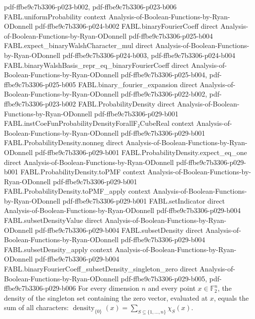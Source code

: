 \begin{theorem}
  {pdf-ffbe9c7b3306-p023-b002,
    pdf-ffbe9c7b3306-p023-b006}
\proofstep
  {FABL.uniformProbability}
  {context}
  {Analysis-of-Boolean-Functions-by-Ryan-ODonnell}
  {pdf-ffbe9c7b3306-p024-b002}
\proofstep
  {FABL.binaryFourierCoeff}
  {direct}
  {Analysis-of-Boolean-Functions-by-Ryan-ODonnell}
  {pdf-ffbe9c7b3306-p025-b004}
\proofstep
  {FABL.expect_binaryWalshCharacter_mul}
  {direct}
  {Analysis-of-Boolean-Functions-by-Ryan-ODonnell}
  {pdf-ffbe9c7b3306-p024-b003,
    pdf-ffbe9c7b3306-p024-b004}
\proofstep
  {FABL.binaryWalshBasis_repr_eq_binaryFourierCoeff}
  {direct}
  {Analysis-of-Boolean-Functions-by-Ryan-ODonnell}
  {pdf-ffbe9c7b3306-p025-b004,
    pdf-ffbe9c7b3306-p025-b005}
\proofstep
  {FABL.binary_fourier_expansion}
  {direct}
  {Analysis-of-Boolean-Functions-by-Ryan-ODonnell}
  {pdf-ffbe9c7b3306-p022-b002,
    pdf-ffbe9c7b3306-p023-b002}
\proofstep
  {FABL.ProbabilityDensity}
  {direct}
  {Analysis-of-Boolean-Functions-by-Ryan-ODonnell}
  {pdf-ffbe9c7b3306-p029-b001}
\proofstep
  {FABL.instCoeFunProbabilityDensityForallF₂CubeReal}
  {context}
  {Analysis-of-Boolean-Functions-by-Ryan-ODonnell}
  {pdf-ffbe9c7b3306-p029-b001}
\proofstep
  {FABL.ProbabilityDensity.nonneg}
  {direct}
  {Analysis-of-Boolean-Functions-by-Ryan-ODonnell}
  {pdf-ffbe9c7b3306-p029-b001}
\proofstep
  {FABL.ProbabilityDensity.expect_eq_one}
  {direct}
  {Analysis-of-Boolean-Functions-by-Ryan-ODonnell}
  {pdf-ffbe9c7b3306-p029-b001}
\proofstep
  {FABL.ProbabilityDensity.toPMF}
  {context}
  {Analysis-of-Boolean-Functions-by-Ryan-ODonnell}
  {pdf-ffbe9c7b3306-p029-b001}
\proofstep
  {FABL.ProbabilityDensity.toPMF_apply}
  {context}
  {Analysis-of-Boolean-Functions-by-Ryan-ODonnell}
  {pdf-ffbe9c7b3306-p029-b001}
\proofstep
  {FABL.setIndicator}
  {direct}
  {Analysis-of-Boolean-Functions-by-Ryan-ODonnell}
  {pdf-ffbe9c7b3306-p029-b004}
\proofstep
  {FABL.subsetDensityValue}
  {direct}
  {Analysis-of-Boolean-Functions-by-Ryan-ODonnell}
  {pdf-ffbe9c7b3306-p029-b004}
\proofstep
  {FABL.subsetDensity}
  {direct}
  {Analysis-of-Boolean-Functions-by-Ryan-ODonnell}
  {pdf-ffbe9c7b3306-p029-b004}
\proofstep
  {FABL.subsetDensity_apply}
  {context}
  {Analysis-of-Boolean-Functions-by-Ryan-ODonnell}
  {pdf-ffbe9c7b3306-p029-b004}
\proofstep
  {FABL.binaryFourierCoeff_subsetDensity_singleton_zero}
  {direct}
  {Analysis-of-Boolean-Functions-by-Ryan-ODonnell}
  {pdf-ffbe9c7b3306-p029-b005,
    pdf-ffbe9c7b3306-p029-b006}
For every dimension $n$ and every point $x\in\mathbb{F}_2^n$, the density of the
singleton set containing the zero vector, evaluated at $x$, equals the sum of all
characters:
$\operatorname{density}_{\{0\}}(x)=\sum_{S\subseteq\{1,\ldots,n\}}\chi_S(x)$.
\end{theorem}

